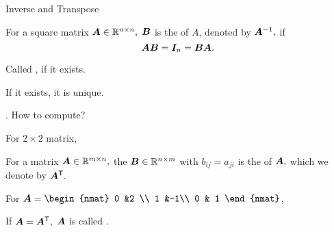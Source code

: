 \documentclass[handout,fleqn,aspectratio=169]{beamer}
\begin{document}
\begin{frame}{Inverse and Transpose}

{
\plitemsep 0.1in
\bci 
\item For a square matrix $\bm{A} \in {\mathbb R}^{n \times n},$ $\bm{B}$ is the  of $A$, denoted by ${{\bm{A}}^{-1}},$ if $$\bm{AB} = \bm{I}_n = \bm{BA}.$$

\item Called , if it exists.  

\item If it exists, it is unique. 

\item {}. How to compute?

\item For $2\times 2$ matrix, 
\eci
}
{
\plitemsep 0.1in
\bci 
\item For a matrix $\bm{A} \in {\mathbb R}^{m \times n},$ the $\bm{B} \in {\mathbb R}^{n \times m}$ with $b_{ij} = a_{ji}$ is the  of $\bm{A},$ which we denote by ${\bm{A}}^{\mathsf{T}}.$ 

\item \exam For 
$\mat{A} = 
\begin{nmat} 
 0 &2 \\
 1  &-1\\
 0  & 1
\end{nmat}
$,

\item If $\bm{A} = {\bm{A}}^{\mathsf{T}},$ $\bm{A}$ is called .
\eci
}

\end{frame}
\end{document}
